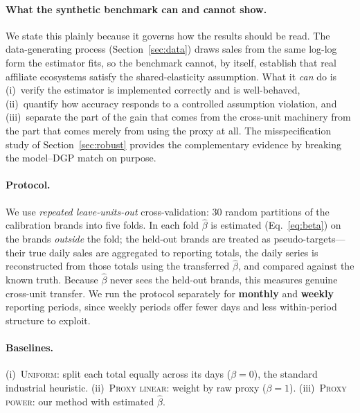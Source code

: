 \documentclass[11pt]{article}
\begin{document}
\paragraph{What the synthetic benchmark can and cannot show.}
We state this plainly because it governs how the results should be read. The
data-generating process (Section~\ref{sec:data}) draws sales from the same
log-log form the estimator fits, so the benchmark cannot, by itself, establish
that real affiliate ecosystems satisfy the shared-elasticity assumption. What it
\emph{can} do is (i)~verify the estimator is implemented correctly and is
well-behaved, (ii)~quantify how accuracy responds to a controlled assumption
violation, and (iii)~separate the part of the gain that comes from the cross-unit
machinery from the part that comes merely from using the proxy at all. The
misspecification study of Section~\ref{sec:robust} provides the complementary
evidence by breaking the model--DGP match on purpose.

\paragraph{Protocol.}
We use \emph{repeated leave-units-out} cross-validation: $30$ random partitions
of the calibration brands into five folds. In each fold $\hat{\beta}$ is
estimated (Eq.~\ref{eq:beta}) on the brands \emph{outside} the fold; the held-out
brands are treated as pseudo-targets---their true daily sales are aggregated to
reporting totals, the daily series is reconstructed from those totals using the
transferred $\hat{\beta}$, and compared against the known truth. Because
$\hat\beta$ never sees the held-out brands, this measures genuine cross-unit
transfer. We run the protocol separately for \textbf{monthly} and \textbf{weekly}
reporting periods, since weekly periods offer fewer days and less within-period
structure to exploit.

\paragraph{Baselines.} (i)~\textsc{Uniform}: split each total equally across its
days ($\beta\!=\!0$), the standard industrial heuristic. (ii)~\textsc{Proxy
linear}: weight by raw proxy ($\beta\!=\!1$). (iii)~\textsc{Proxy power}: our
method with estimated $\hat{\beta}$.
\end{document}
